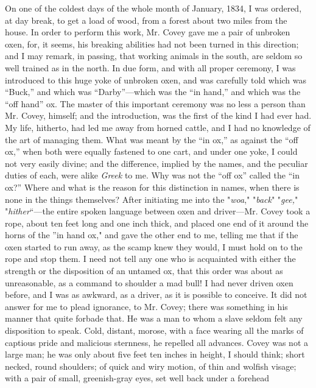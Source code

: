 On one of the coldest days of the whole month of January, 1834, I was
ordered, at day break, to get a load of wood, from a forest about two
miles from the {\protect\hypertarget{209}{}{}}house. In order to perform
this work, Mr. Covey gave me a pair of unbroken oxen, for, it seems, his
breaking abilities had not been turned in this direction; and I may
remark, in passing, that working animals in the south, are seldom so
well trained as in the north. In due form, and with all proper ceremony,
I was introduced to this huge yoke of unbroken oxen, and was carefully
told which was ``Buck,'' and which was ``Darby''---which was the ``in
hand,'' and which was the ``off hand'' ox. The master of this important
ceremony was no less a person than Mr. Covey, himself; and the
introduction, was the first of the kind I had ever had. My life,
hitherto, had led me away from horned cattle, and I had no knowledge of
the art of managing them. What was meant by the ``in ox,'' as against
the ``off ox,'' when both were equally fastened to one cart, and under
one yoke, I could not very easily divine; and the difference, implied by
the names, and the peculiar duties of each, were alike \emph{Greek} to
me. Why was not the ``off ox'' called the ``in ox?'' Where and what is
the reason for this distinction in names, when there is none in the
things themselves? After initiating me into the "\emph{woa},"
"\emph{back}" "\emph{gee,}" "\emph{hither}``---the entire spoken
language between oxen and driver---Mr. Covey took a rope, about ten feet
long and one inch thick, and placed one end of it around the horns of
the ''in hand ox," and gave the other end to me, telling me that if the
oxen started to run away, as the scamp knew they would, I must hold on
to the rope and stop them. I need not tell any one who is acquainted
with either the strength or the disposition of an untamed ox, that
{\protect\hypertarget{210}{}{}}this order was about as unreasonable, as
a command to shoulder a mad bull! I had never driven oxen before, and I
was as awkward, as a driver, as it is possible to conceive. It did not
answer for me to plead ignorance, to Mr. Covey; there was something in
his manner that quite forbade that. He was a man to whom a slave seldom
felt any disposition to speak. Cold, distant, morose, with a face
wearing all the marks of captious pride and malicious sternness, he
repelled all advances. Covey was not a large man; he was only about five
feet ten inches in height, I should think; short necked, round
shoulders; of quick and wiry motion, of thin and wolfish visage; with a
pair of small, greenish-gray eyes, set well back under a forehead
